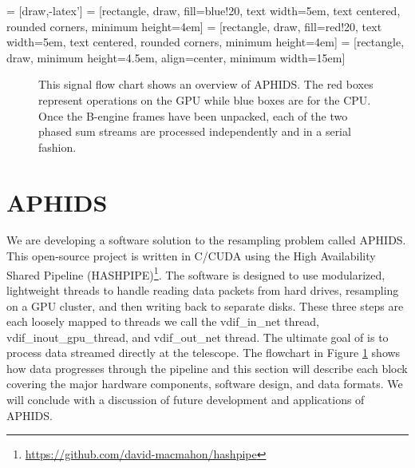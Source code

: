  = [draw,-latex']
 = [rectangle, draw, fill=blue!20,
    text width=5em, text centered, rounded corners, minimum height=4em]
 = [rectangle, draw, fill=red!20,
    text width=5em, text centered, rounded corners, minimum height=4em]
 = [rectangle, draw, minimum height=4.5em, align=center, minimum width=15em] 

\begin{figure}[t!]
\linespread{1.}\selectfont{}
\begin{center}
\caption{This signal flow chart shows an overview of APHIDS.  The red boxes represent operations on the GPU 
while blue boxes are for the CPU.  Once the B-engine frames have been unpacked, each of the two phased sum 
streams are processed independently and in a serial fashion.}
\label{fig:aphids_flow_chart}
\end{center}
\end{figure}

\section{APHIDS} \label{sec:aphids}

We are developing a software solution to the resampling problem called APHIDS.  This 
open-source project is written in C/CUDA using
the High Availability Shared Pipeline 
(HASHPIPE)\footnote{\url{https://github.com/david-macmahon/hashpipe}}.  The software is designed to use 
modularized, lightweight threads to handle reading data packets from hard drives, resampling on a GPU cluster, 
and then writing back to separate disks.  These three steps are each loosely mapped to threads we call the 
vdif\_in\_net thread, vdif\_inout\_gpu\_thread, and vdif\_out\_net thread. 
The ultimate goal of is to process data streamed directly at the telescope.  The flowchart in Figure 
\ref{fig:aphids_flow_chart} shows how data progresses 
through the pipeline and this section will describe each block covering the major hardware components, software 
design, and data formats.  We will conclude with a discussion of future development and applications of APHIDS.


